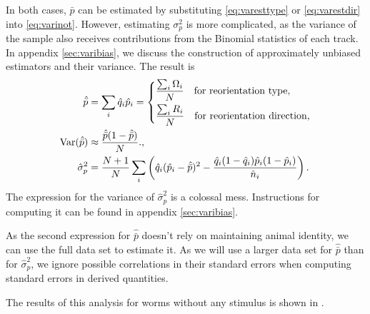 \documentclass[12pt]{article}
\begin{document}
In both cases, $\bar{p}$ can be estimated by substituting \eqref{eq:varesttype} or \eqref{eq:varestdir} into \eqref{eq:varinot}. However, estimating $\sigma_p^2$ is more complicated, as the variance of the sample also receives contributions from the Binomial statistics of each track. In appendix \ref{sec:varibias}, we discuss the construction of approximately unbiased estimators and their variance. The result is
%
\begin{equation}\label{eq:variests}
  \begin{aligned}
    \hat{\bar{p}} &= \sum_i \hat{q}_i \hat{p}_i
       =\left\{\begin{aligned}
      & \frac{\sum_i \Omega_i}{N} \quad \text{for reorientation type,}\\
      & \frac{\sum_i R_i}{N}  \quad \text{for reorientation direction,}
       \end{aligned}\right. \\
    \operatorname{Var}(\hat{\bar{p}}) &\approx \frac{\hat{\bar{p}}(1-\hat{\bar{p}})}{N}.,\\
    \hat{\sigma}_p^2 &= \frac{N+1}{N} \sum_i\left (  \hat{q}_i(\hat{p}_i-\hat{\bar{p}})^2 - \frac{\hat{q}_i(1-\hat{q}_i)\hat{p}_i(1-\hat{p}_i)}{\hat{n}_i} \right ).
  \end{aligned}
\end{equation}
%
The expression for the variance of $\hat{\sigma}_p^2$ is a colossal mess. Instructions for computing it can be found in appendix \ref{sec:varibias}.

As the second expression for $\hat{\bar{p}}$ doesn't rely on maintaining animal identity, we can use the full data set to estimate it. As we will use a larger data set for $\hat{\bar{p}}$ than for $\hat{\sigma}_p^2$, we ignore possible correlations in their standard errors when computing standard errors in derived quantities.

The results of this analysis for worms without any stimulus is shown in .
\end{document}
